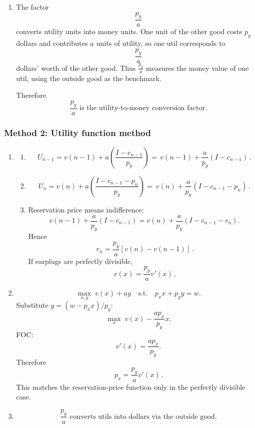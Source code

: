 \documentclass[12pt]{article}
\begin{document}
\begin{enumerate}[label=(\alph*)]
    It is not literally the same as the discrete reservation-price formula
    \[
    r_n=\frac{p_y}{a}[v(n)-v(n-1)],
    \]
    because that uses a finite difference, whereas inverse demand uses a derivative. However, in the perfectly divisible case the reservation-price function becomes
    \[
    r(x)=\frac{p_y}{a}v'(x),
    \]
    so the two coincide in the continuous formulation.

    \item
    The factor
    \[
    \frac{p_y}{a}
    \]
    converts utility units into money units. One unit of the other good costs \(p_y\) dollars and contributes \(a\) units of utility, so one util corresponds to
    \[
    \frac{p_y}{a}
    \]
    dollars’ worth of the other good. Thus \(\frac{p_y}{a}\) measures the money value of one util, using the outside good as the benchmark.

    Therefore
    \[
    \boxed{\,\frac{p_y}{a}\text{ is the utility-to-money conversion factor.}\,}
    \]
\end{enumerate}

\newpage
\subsubsection{Method 2: Utility function method}
\begin{enumerate}[label=(\alph*)]
    \item
    \begin{enumerate}[label=(\roman*)]
        \item
        \[
        U_{n-1}=v(n-1)+a\left(\frac{I-c_{n-1}}{p_y}\right)
        =\boxed{\,v(n-1)+\frac{a}{p_y}(I-c_{n-1})\, }.
        \]

        \item
        \[
        U_n=v(n)+a\left(\frac{I-c_{n-1}-p_n}{p_y}\right)
        =\boxed{\,v(n)+\frac{a}{p_y}(I-c_{n-1}-p_n)\, }.
        \]

        \item
        Reservation price means indifference:
        \[
        v(n-1)+\frac{a}{p_y}(I-c_{n-1})
        =
        v(n)+\frac{a}{p_y}(I-c_{n-1}-r_n).
        \]
        Hence
        \[
        \boxed{\,r_n=\frac{p_y}{a}[v(n)-v(n-1)]\, }.
        \]
        If earplugs are perfectly divisible,
        \[
        \boxed{\,r(x)=\frac{p_y}{a}v'(x)\, }.
        \]
    \end{enumerate}

    \item
    \[
    \max_{x,y}\; v(x)+ay
    \quad\text{s.t.}\quad
    p_xx+p_yy=w.
    \]
    Substitute \(y=(w-p_xx)/p_y\):
    \[
    \max_x\; v(x)-\frac{ap_x}{p_y}x.
    \]
    FOC:
    \[
    v'(x)=\frac{ap_x}{p_y}.
    \]
    Therefore
    \[
    \boxed{\,p_x=\frac{p_y}{a}v'(x)\, }.
    \]
    This matches the reservation-price function only in the perfectly divisible case.

    \item
    \[
    \boxed{\,\frac{p_y}{a}\text{ converts utils into dollars via the outside good.}\,}
    \]
\end{enumerate}
\end{document}
